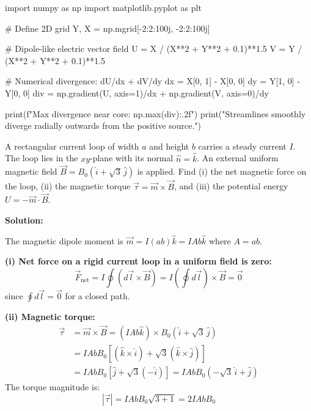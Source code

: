 \begin{pythonbox}
import numpy as np
import matplotlib.pyplot as plt

# Define 2D grid
Y, X = np.mgrid[-2:2:100j, -2:2:100j]

# Dipole-like electric vector field
U = X / (X**2 + Y**2 + 0.1)**1.5
V = Y / (X**2 + Y**2 + 0.1)**1.5

# Numerical divergence: dU/dx + dV/dy
dx = X[0, 1] - X[0, 0]
dy = Y[1, 0] - Y[0, 0]
div = np.gradient(U, axis=1)/dx + np.gradient(V, axis=0)/dy

print(f"Max divergence near core: {np.max(div):.2f}")
print("Streamlines smoothly diverge radially outwards from the positive source.")
\end{pythonbox}

\begin{psctexample}
A rectangular current loop of width $a$ and height $b$ carries a steady current $I$. The loop lies in the $xy$-plane with its normal $\hat{n} = \hat{k}$. An external uniform magnetic field $\vec{B} = B_0(\hat{i} + \sqrt{3}\,\hat{j})$ is applied. Find (i) the net magnetic force on the loop, (ii) the magnetic torque $\vec{\tau} = \vec{m} \times \vec{B}$, and (iii) the potential energy $U = -\vec{m}\cdot\vec{B}$.

\textbf{Solution:}

The magnetic dipole moment is $\vec{m} = I(ab)\hat{k} = IAb\hat{k}$ where $A = ab$.

\textbf{(i) Net force on a rigid current loop in a uniform field is zero:}
\begin{equation}
\vec{F}_\text{net} = I\oint (d\vec{l} \times \vec{B}) = I\left(\oint d\vec{l}\right) \times \vec{B} = \vec{0}
\end{equation}
since $\oint d\vec{l} = \vec{0}$ for a closed path.

\textbf{(ii) Magnetic torque:}
\begin{align}
\vec{\tau} &= \vec{m} \times \vec{B} = (IAb\hat{k}) \times B_0(\hat{i} + \sqrt{3}\,\hat{j}) \\
           &= IAb B_0\left[(\hat{k}\times\hat{i}) + \sqrt{3}(\hat{k}\times\hat{j})\right] \\
           &= IAb B_0\left[\hat{j} + \sqrt{3}(-\hat{i})\right] = IAb B_0(-\sqrt{3}\,\hat{i} + \hat{j})
\end{align}
The torque magnitude is:
\begin{equation}
\boxed{|\vec{\tau}| = IAb B_0\sqrt{3 + 1} = 2IAb B_0}
\end{equation}


\end{psctexample}
